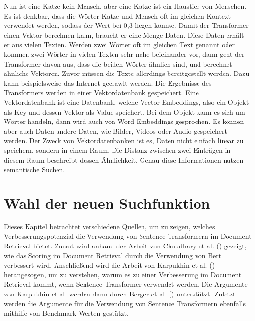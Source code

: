 Nun ist eine Katze kein Mensch, aber eine Katze ist ein Haustier von Menschen.
Es ist denkbar, dass die Wörter Katze und Mensch oft im gleichen Kontext verwendet werden, sodass der Wert bei 0,3 liegen könnte.
Damit der Transformer einen Vektor berechnen kann, braucht er eine Menge Daten.
Diese Daten erhält er aus vielen Texten.
Werden zwei Wörter oft im gleichen Text genannt oder kommen zwei Wörter in vielen Texten sehr nahe beieinander vor, dann geht der Transformer davon aus, dass die beiden Wörter ähnlich sind, und berechnet ähnliche Vektoren.
Zuvor müssen die Texte allerdings bereitgestellt werden.
Dazu kann beispielsweise das Internet gecrawlt werden.
Die Ergebnisse des Transformers werden in einer Vektordatenbank gespeichert.
Eine Vektordatenbank ist eine Datenbank, welche Vector Embeddings, also ein Objekt als Key und dessen Vektor als Value speichert.
Bei dem Objekt kann es sich um Wörter handeln, dann wird auch von Word Embeddings gesprochen.
Es können aber auch Daten andere Daten, wie Bilder, Videos oder Audio gespeichert werden.
Der Zweck von Vektordatenbanken ist es, Daten nicht einfach linear zu speichern, sondern in einem Raum.
Die Distanz zwischen zwei Einträgen in diesem Raum beschreibt dessen Ähnlichkeit.
Genau diese Informationen nutzen semantische Suchen.

\section{Wahl der neuen Suchfunktion}
Dieses Kapitel betrachtet verschiedene Quellen, um zu zeigen, welches Verbesserungspotenzial die Verwendung von Sentence Transformern im Document Retrieval bietet.
Zuerst wird anhand der Arbeit von Choudhary et al. (\citeyear{Choudhary_Guttikonda_Chowdhury_Learmonth_2020}) gezeigt, wie das Scoring im Document Retrieval durch die Verwendung von Bert verbessert wird.
Anschließend wird die Arbeit von Karpukhin et al. (\citeyear{Karpukhin_Oguz_Min_Lewis_Wu_Edunov_Chen_Yih_2020}) herangezogen, um zu verstehen, warum es zu einer Verbesserung im Document Retrieval kommt, wenn Sentence Transformer verwendet werden.
Die Argumente von Karpukhin et al. werden dann durch Berger et al. (\citeyear{Berger_Caruana_Cohn_Freitag_Mittal_2000}) unterstützt.
Zuletzt werden die Argumente für die Verwendung von Sentence Transformern ebenfalls mithilfe von Benchmark-Werten gestützt.\\

